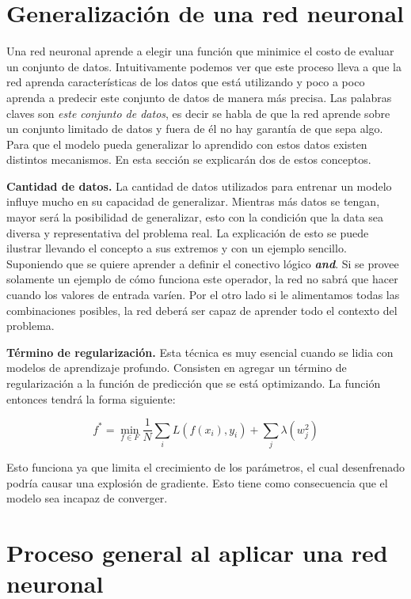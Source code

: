 \section{Generalización de una red neuronal}

Una red neuronal aprende a elegir una función que minimice el costo de evaluar un conjunto de datos. Intuitivamente podemos ver que este proceso lleva a que la red aprenda características de los datos que está utilizando y poco a poco aprenda a predecir este conjunto de datos de manera más precisa. Las palabras claves son \textit{este conjunto de datos}, es decir se habla de que la red aprende sobre un conjunto limitado de datos y fuera de él no hay garantía de que sepa algo. Para que el modelo pueda generalizar lo aprendido con estos datos existen distintos mecanismos. En esta sección se explicarán dos de estos conceptos.

\textbf{Cantidad de datos.} La cantidad de datos utilizados para entrenar un modelo influye mucho en su capacidad de generalizar. Mientras más datos se tengan, mayor será la posibilidad de generalizar, esto con la condición que la data sea diversa y representativa del problema real. La explicación de esto se puede ilustrar llevando el concepto a sus extremos y con un ejemplo sencillo. Suponiendo que se quiere aprender a definir el conectivo lógico \textbf{\textit{and}}. Si se provee solamente un ejemplo de cómo funciona este operador, la red no sabrá que hacer cuando los valores de entrada varíen. Por el otro lado si le alimentamos todas las combinaciones posibles, la red deberá ser capaz de aprender todo el contexto del problema.

\textbf{Término de regularización.} Esta técnica es muy esencial cuando se lidia con modelos de aprendizaje profundo. Consisten en agregar un término de regularización a la función de predicción que se está optimizando. La función entonces tendrá la forma siguiente: %

$$f^* = \min_{f \in F} \frac{1}{N} \sum_{i} L(f(x_i), y_i) + \sum_{j} \lambda(w_j^2)$$

Esto funciona ya que limita el crecimiento de los parámetros, el cual desenfrenado podría causar una explosión de gradiente. Esto tiene como consecuencia que el modelo sea incapaz de converger.

\section{Proceso general al aplicar una red neuronal}
\label{sec:nlpprocess}

